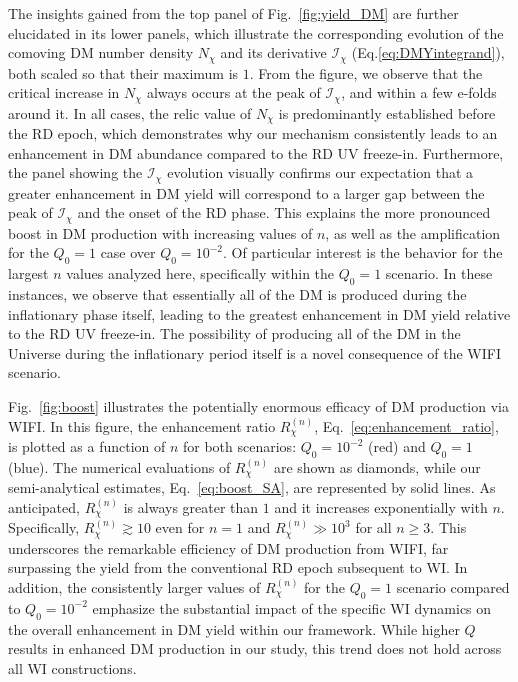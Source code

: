 \documentclass[notitlepage,nofootinbib,preprintnumbers,aps,superscriptaddress,twocolumn]{revtex4-1}
\begin{document}
The insights gained from the top panel of Fig.~\ref{fig:yield_DM} are further elucidated in its lower panels, which illustrate the corresponding evolution of the comoving DM number density $N_\chi$ and its derivative $\mathcal{I}_\chi$ (Eq.\eqref{eq:DMYintegrand}), both scaled so that their maximum is $1$. From the figure, we observe that the critical increase in $N_\chi$ always occurs at the peak of $\mathcal{I}_\chi$,  and within a few e-folds around it. In all cases, the relic value of $N_\chi$ is predominantly established before the RD epoch,  which demonstrates why our mechanism consistently leads to an enhancement in DM abundance compared to the RD UV freeze-in. Furthermore, the panel showing the $\mathcal{I}_\chi$ evolution visually confirms our expectation that a greater enhancement in DM yield will correspond to a larger gap between the peak of $\mathcal{I}_\chi$ and the onset of the RD phase. This explains the more pronounced boost in DM production with increasing values of $n$, as well as the amplification for the $Q_0=1$ case over $Q_0=10^{-2}$. Of particular interest is the behavior for the largest  $n$ values analyzed here, specifically within the $Q_0=1$ scenario. In these instances, we observe that essentially all of the DM is produced during the inflationary phase itself, leading to the greatest enhancement in DM yield relative to the RD UV freeze-in.  The possibility of producing all of the DM in the Universe during the inflationary period itself is a novel consequence of the WIFI scenario.

Fig.~\ref{fig:boost} illustrates the potentially enormous efficacy of DM production via WIFI.
In this figure, the enhancement ratio $R^{(n)}_\chi$, Eq.~\eqref{eq:enhancement_ratio}, is plotted as a function of $n$ for both scenarios: $Q_0=10^{-2}$ (red) and $Q_0=1$ (blue).  The numerical evaluations of $R^{(n)}_\chi$ are shown as diamonds, while our semi-analytical estimates, Eq.~\eqref{eq:boost_SA}, are represented by solid lines. As anticipated, $R^{(n)}_\chi$ is always greater than $1$ and it increases exponentially with $n$. Specifically, $R^{(n)}_\chi\gtrsim 10$ even for $n=1$ and $R^{(n)}_\chi\gg 10^{3}$ for all $n\geq 3$. This underscores the remarkable efficiency of DM production from WIFI, far surpassing the yield from the conventional RD epoch subsequent to WI. In addition, the consistently larger values of $R^{(n)}_\chi$ for the $Q_0=1$ scenario compared to $Q_0=10^{-2}$ emphasize the substantial impact of the specific WI dynamics on the overall enhancement in DM yield within our framework. While higher $Q$ results in enhanced DM production in our study, this trend does not hold across all WI constructions.
\end{document}
